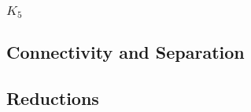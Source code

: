 \begin{definition}[$M(K_{3,3})$]
  \label{def:M_K_3_3}
\end{definition}

\begin{definition}[$M(K_{3,3})^{*}$]
  \label{def:M_K_3_3_dual}
\end{definition}

\subsubsection{$K_{5}$}

\begin{definition}[$M(K_{5})$]
  \label{def:M_K_5}
\end{definition}

\begin{definition}[$M(K_{5})^{*}$]
  \label{def:M_K_5_dual}
\end{definition}


\subsection{Connectivity and Separation}

\begin{definition}[$k$-connectivity]
  \label{def:k_conn}
\end{definition}

\begin{definition}[$k$-separation]
  \label{def:k_sep}
\end{definition}


\subsection{Reductions}

\begin{definition}[deletion]
  \label{def:deletion}
\end{definition}

\begin{definition}[contraction]
  \label{def:contraction}
\end{definition}


